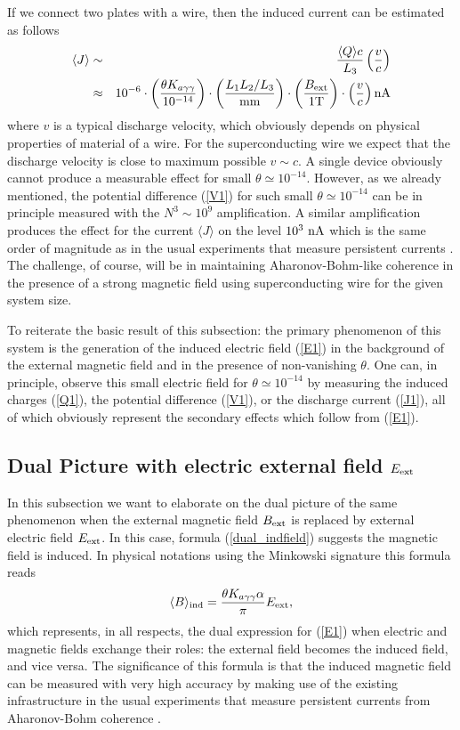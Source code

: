\documentclass[ twocolumn,aps,prd,   
               preprintnumbers,numbers,sort&compress,nofootinbib,
                            showpacs,superscriptaddress,
               colorlinks,
               linkcolor=blue,   
               citecolor=blue]{revtex4-1}   \newcommand{\exclude}[1]{}
\newcommand{\be}{\begin{eqnarray}}
\newcommand{\ee}{\end{eqnarray}}
\def\la{\langle}
\def\ra{\rangle}
\begin{document}
 If we connect two plates with a   wire, then the induced current can be estimated as follows   
 \be
 \label{J1}
\la J \ra &\sim& \frac{\la Q\ra c }{L_3}\left(\frac{v}{c}\right)  \\  &\approx &10^{-6} \cdot \left(\frac{\theta K_{a\gamma\gamma} }{10^{-14}}\right)\cdot \left(\frac{L_1L_2/L_3}{\rm mm}\right) \cdot \left(\frac{B_{\rm ext}}{\rm  1 T}\right)\cdot \left(\frac{v}{c}\right) {\rm nA}\nonumber
\ee
where $v$ is a typical discharge velocity, which obviously depends on physical properties of  material of a wire. For the superconducting wire we expect that the discharge velocity is close to maximum possible  $v\sim c$.  A single device obviously cannot 
produce a measurable  effect for   small $\theta\simeq 10^{-14}$. However, as we already mentioned, the potential difference (\ref{V1}) for  such small  $\theta\simeq 10^{-14}$  can be in principle measured  with  the   $N^3\sim 10^9$ amplification. A similar amplification  produces the  effect  for the current  $ \la J \ra  $ on the level $10^3 ~{\rm nA}$ which is the same order of magnitude as   in the usual experiments that measure  persistent currents
\cite{Buttiker:1983,Chandrasekharetal:1991, Shanks:2011}. 
The challenge, of course,  will be in maintaining Aharonov-Bohm-like coherence in the presence of a strong magnetic field using superconducting wire  for the given system size.   

To reiterate the basic result of this subsection: the primary phenomenon of  this system is  the generation of the induced electric field (\ref{E1})  in the background of the external magnetic field and in the presence of non-vanishing  $\theta$. One can, in principle, observe this   small electric field for $\theta\simeq 10^{-14}$ by  measuring the induced charges   (\ref{Q1}), the potential difference (\ref{V1}), or the discharge current (\ref{J1}), all of which obviously represent the secondary effects which follow from   (\ref{E1}). 

\subsection{Dual Picture with  electric  external field  $E_{\rm ext}$}\label{dual}
In this subsection we want to elaborate on  the dual picture of the same phenomenon when the external magnetic field $B_{\rm ext}$ is replaced by external electric field $E_{\rm ext}$. In this case, formula (\ref{dual_indfield}) suggests the magnetic field is induced.   
In physical notations  using the    Minkowski  signature this formula reads
\be
\label{B1}
\la B\ra_{\rm ind} = \frac{\theta K_{a\gamma\gamma}\alpha}{\pi} E_{\rm ext}, 
\ee
which  represents, in all respects,  the dual expression for  (\ref{E1}) when electric and magnetic fields  exchange their roles: the external field becomes the  induced field, and vice versa. The significance of this formula is that the induced magnetic field can be measured with very high accuracy  
 by making use of the existing infrastructure in the usual experiments that measure  persistent currents from Aharonov-Bohm coherence 
 \cite{Buttiker:1983,Chandrasekharetal:1991, Shanks:2011}. 
 
\end{document}
